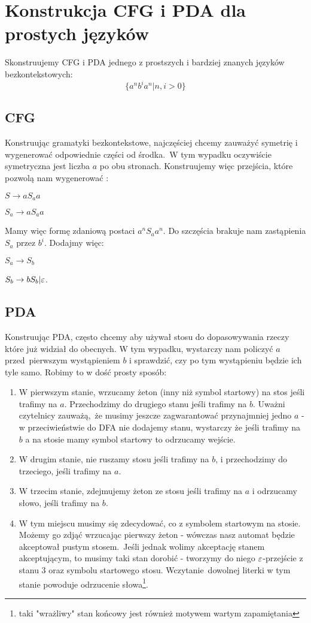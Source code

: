 \section{Konstrukcja CFG i PDA dla prostych języków}
\label{example-cfg-pda}

Skonstruujemy CFG i PDA jednego z prostszych i bardziej znanych języków bezkontekstowych:
\[
	\{ a^nb^ia^n | n, i > 0 \}
\]

\subsection{CFG}

Konstruując gramatyki bezkontekstowe, najczęściej chcemy zauważyć symetrię i wygenerować odpowiednie części od środka.\
W tym wypadku oczywiście symetryczna jest liczba \(a\) po obu stronach. Konstruujemy więc przejścia, które pozwolą nam wygenerować :

\(S \rightarrow aS_aa\)

\(S_a \rightarrow aS_aa\)

Mamy więc formę zdaniową postaci \(a^nS_aa^n\). Do szczęścia brakuje nam zastąpienia \(S_a\) przez  \(b^i\). Dodajmy więc:

\(S_a \rightarrow S_b\)

\(S_b \rightarrow bS_b | \varepsilon\).

\subsection{PDA}

Konstruując PDA, często chcemy aby używał stosu do dopasowywania rzeczy które już widział do obecnych. W tym wypadku, wystarczy nam policzyć \(a\) przed\
pierwszym wystąpieniem \(b\) i sprawdzić, czy po tym wystąpieniu będzie ich tyle samo. Robimy to w dość prosty sposób:

\begin{enumerate}
	\item W pierwszym stanie, wrzucamy żeton (inny niż symbol startowy) na stos jeśli trafimy na \(a\). Przechodzimy do drugiego stanu jeśli trafimy na \(b\). Uważni czytelnicy zauważą,\
	      że musimy jeszcze zagwarantować przynajmniej jedno \(a\) - w przeciwieństwie do DFA nie dodajemy stanu, wystarczy że jeśli trafimy na \(b\) a na stosie mamy symbol startowy to odrzucamy wejście.
	\item W drugim stanie, nie ruszamy stosu jeśli trafimy na \(b\), i przechodzimy do trzeciego, jeśli trafimy na \(a\).
	\item W trzecim stanie, zdejmujemy żeton ze stosu jeśli trafimy na \(a\) i odrzucamy słowo, jeśli trafimy na \(b\).
	\item W tym miejscu musimy się zdecydować, co z symbolem startowym na stosie. Możemy go zdjąć wrzucając pierwszy żeton - wówczas nasz automat będzie akceptował pustym stosem.\
	      Jeśli jednak wolimy akceptację stanem akceptującym, to musimy taki stan dorobić - tworzymy do niego \(\varepsilon\)-przejście z stanu 3 oraz symbolu startowego stosu. Wczytanie\
	      dowolnej literki w tym stanie powoduje odrzucenie słowa\footnote{taki "wrażliwy" stan końcowy jest również motywem wartym zapamiętania}.
\end{enumerate}

